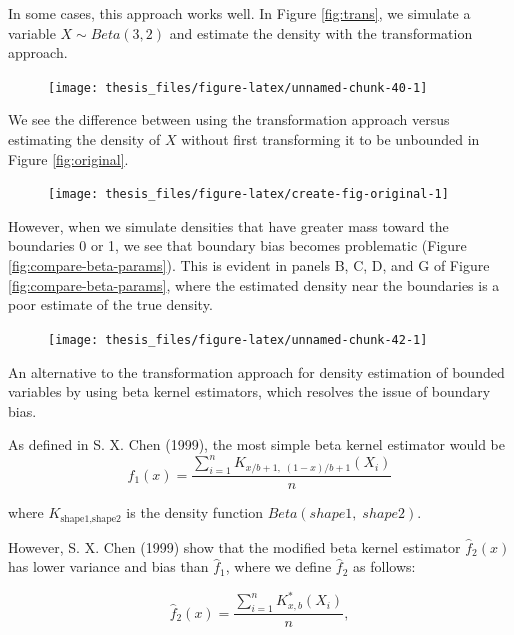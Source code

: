 \documentclass[12pt,twoside]{smiththesis}
\begin{document}
In some cases, this approach works well. In Figure \ref{fig:trans}, we simulate a variable \(X \sim Beta(3,2)\) and estimate the density with the transformation approach.
\begin{figure}

{\centering \texttt{[image: thesis\_files/figure-latex/unnamed-chunk-40-1]} 

}

\caption{\label{fig:trans}}\label{fig:unnamed-chunk-40}
\end{figure}
We see the difference between using the transformation approach versus estimating the density of \(X\) without first transforming it to be unbounded in Figure \ref{fig:original}.
\begin{figure}

{\centering \texttt{[image: thesis\_files/figure-latex/create-fig-original-1]} 

}

\caption{\label{fig:original}}\label{fig:create-fig-original}
\end{figure}
However, when we simulate densities that have greater mass toward the boundaries 0 or 1, we see that boundary bias becomes problematic (Figure \ref{fig:compare-beta-params}). This is evident in panels B, C, D, and G of Figure \ref{fig:compare-beta-params}, where the estimated density near the boundaries is a poor estimate of the true density.
\begin{figure}

{\centering \texttt{[image: thesis\_files/figure-latex/unnamed-chunk-42-1]} 

}

\caption{\label{fig:compare-beta-params}}\label{fig:unnamed-chunk-42}
\end{figure}
An alternative to the transformation approach for density estimation of bounded variables by using beta kernel estimators, which resolves the issue of boundary bias.

As defined in S. X. Chen (1999), the most simple beta kernel estimator would be
\[\hat f_1(x) = \dfrac{\sum_{i=1}^n K_{x/b + 1, \; (1-x)/b + 1} (X_i)}{n}\]

where \(K_{\text{shape1}, \text{shape2}}\) is the density function \(Beta(shape1, \; shape2)\).

However, S. X. Chen (1999) show that the modified beta kernel estimator \(\hat f_2(x)\) has lower variance and bias than \(\hat f_1\), where we define \(\hat f_2\) as follows:

\[
\hat f_2(x)  = \dfrac{\sum_{i=1}^n K_{x,b}^*(X_i)}{n},\]
\end{document}
